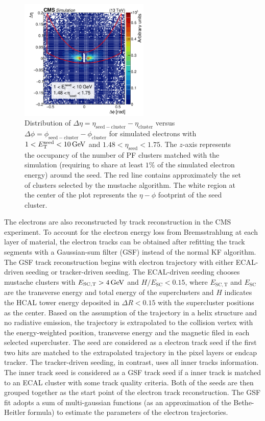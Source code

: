 \begin{figure}\centering
    \includegraphics[width=0.55\textwidth]{figure/reco_beard.png}
    \caption[Distribution of $\Delta\eta$ versus $\Delta\phi$ for simulated electrons.]
    {
        Distribution of $\Delta\eta=\eta_{\mathrm{seed-cluster}}-\eta_{\mathrm{cluster}}$ versus $\Delta\phi = \phi_{\mathrm{seed-cluster}}  - \phi_{\mathrm{cluster}}$ for simulated electrons with $1 < E_{\mathrm{T}}^{\mathrm{seed}} < 10 \,\text{Ge\hspace{-.08em}V}$ and $1.48 < \eta_{\mathrm{seed}} < 1.75$.
        The $z$-axis represents the occupancy of the number of PF clusters matched with the simulation (requiring to share at least $1\%$ of the simulated electron energy) around the seed. 
        The red line contains approximately the set of clusters selected by the mustache algorithm. 
        The white region at the center of the plot represents the $\eta-\phi$ footprint of the seed cluster.
    }
    \label{fig:reco_beard}
\end{figure}

The electrons are also reconstructed by track reconstruction in the CMS experiment.
To account for the electron energy loss from Bremsstrahlung at each layer of material, the electron tracks can be obtained after refitting the track segments with a Gaussian-sum filter (GSF) instead of the normal KF algorithm. 
The GSF track reconstruction begins with electron trajectory with either ECAL-driven seeding or tracker-driven seeding.
The ECAL-driven seeding chooses mustache clusters with $E_{\mathrm{SC,T}} > 4 \,\text{Ge\hspace{-.08em}V}$ and $H/E_{\mathrm{SC}} < 0.15$, where $E_{\mathrm{SC,T}}$ and $E_{\mathrm{SC}}$ are the transverse energy and total energy of the superclusters and $H$ indicates the HCAL tower energy deposited in $\Delta R < 0.15$ with the supercluster positions as the center.
Based on the assumption of the trajectory in a helix structure and no radiative emission, the trajectory is extrapolated to the collision vertex with the energy-weighted position, transverse energy and the magnetic filed in each selected supercluster.
The seed are considered as a electron track seed if the first two hits are matched to the extrapolated trajectory in the pixel layers or endcap tracker.
The tracker-driven seeding, in contrast, uses all inner tracks information.
The inner track seed is considered as a GSF track seed if a inner track is matched to an ECAL cluster with some track quality criteria.
Both of the seeds are then grouped together as the start point of the electron track reconstruction.
The GSF fit adopts a sum of multi-gaussian functions (as an approximation of the Bethe-Heitler formula) to estimate the parameters of the electron trajectories.

